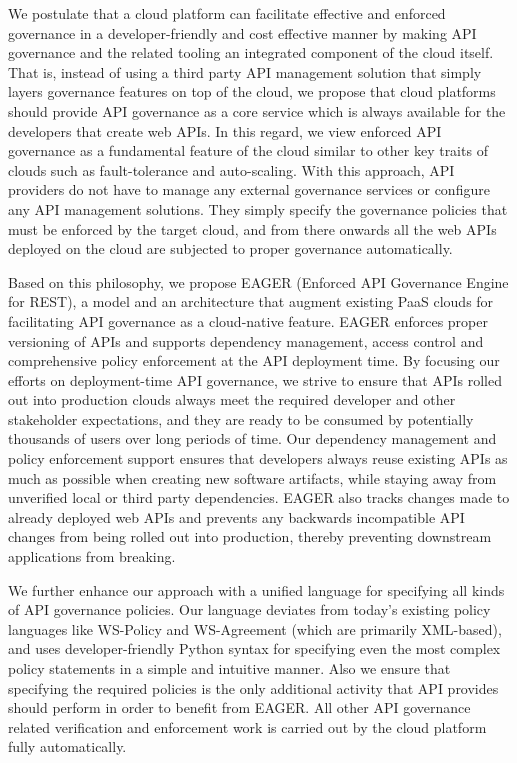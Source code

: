 We postulate that a cloud platform can facilitate effective and enforced governance in a developer-friendly and cost effective manner by
making API governance and the related tooling an integrated component of the cloud itself. That is, instead of using a third party API management
solution that simply layers governance features on top of the cloud, we propose that cloud platforms should provide API governance as a 
core service which is always available for the developers that create web APIs. In this regard, we view enforced API governance as a 
fundamental feature of the cloud similar to other key traits of clouds such as fault-tolerance and auto-scaling. With this
approach, API providers do not have to manage any external governance services or configure any API management solutions. They simply
specify the governance policies that must be enforced by the target cloud, and from there onwards all the web APIs deployed on the cloud
are subjected to proper governance automatically.

Based on this philosophy, we propose EAGER (Enforced API Governance Engine for REST), a model and an architecture that augment existing
PaaS clouds for facilitating API governance as a cloud-native feature. EAGER enforces proper versioning of APIs and supports dependency 
management, access control and comprehensive policy enforcement at the API deployment time. By focusing our efforts on deployment-time
API governance, we strive to ensure that APIs rolled out into production clouds always meet the required developer and other stakeholder
expectations, and they are ready to be consumed by potentially thousands of users over long periods of time. Our dependency management
and policy enforcement support ensures that developers always reuse existing APIs as much as possible when creating new software artifacts,
while staying away from unverified local or third party dependencies. EAGER also tracks changes made to already deployed web APIs and prevents
any backwards incompatible API changes from being rolled out into production, thereby preventing downstream applications from breaking.

We further enhance our approach with a unified language for specifying all kinds of
API governance policies. Our language deviates from today's existing policy languages like WS-Policy and WS-Agreement (which are 
primarily XML-based), and uses developer-friendly Python syntax for specifying even the most complex policy statements in a simple and 
intuitive manner. Also we ensure that specifying the required policies is the only additional activity that API provides should perform in
order to benefit from EAGER. All other API governance related verification and enforcement work is carried out by the cloud platform fully
automatically.

